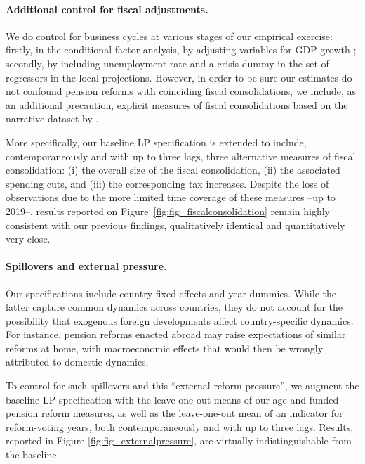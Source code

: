 \documentclass[11pt,english,a4paper, twoside, authoryear]{article}
\begin{document}


\paragraph{Additional control for fiscal adjustments.} We do control for business cycles at various stages of our empirical exercise: firstly, in the conditional factor analysis, by adjusting variables for GDP growth ; secondly, by including unemployment rate and a crisis dummy in the set of regressors in the local projections. However, in order to be sure our estimates do not confound pension reforms with coinciding fiscal consolidations, we include, as an additional precaution, explicit measures of fiscal consolidations based on the narrative dataset by \citet{GLP_austerity_2014}. 

More specifically, our baseline LP specification is extended to include, contemporaneously and with up to three lags, three alternative measures of fiscal consolidation: (i) the overall size of the fiscal consolidation, (ii) the associated spending cuts, and (iii) the corresponding tax increases. Despite the loss of observations due to the more limited time coverage of these measures --up to 2019--, results reported on Figure~\ref{fig:fig_fiscalconsolidation} remain highly consistent with our previous findings, qualitatively identical and quantitatively very close.  

\paragraph{Spillovers and external pressure.} Our specifications include country fixed effects and year dummies. While the latter capture common dynamics across countries, they do not account for the possibility that exogenous foreign developments affect country-specific dynamics. For instance, pension reforms enacted abroad may raise expectations of similar reforms at home, with macroeconomic effects that would then be wrongly attributed to domestic dynamics.

To control for such spillovers and this ``external reform pressure'', we augment the baseline LP specification with the leave-one-out means of our age and funded-pension reform measures, as well as the leave-one-out mean of an indicator for reform-voting years, both contemporaneously and with up to three lags. Results, reported in Figure \ref{fig:fig_externalpressure}, are virtually indistinguishable from the baseline.
\end{document}

